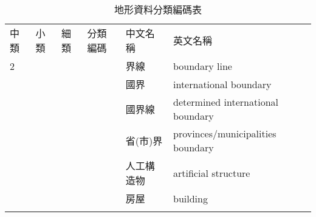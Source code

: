 \begin{table}[htbp]
\centering
\caption{地形資料分類編碼表}
\label{tab:topoItemDemo}
\begin{adjustbox}{max width=\textwidth}
\renewcommand{\arraystretch}{1.4}
\begin{tabular}{
>{\centering\arraybackslash}m{1.2cm} 
>{\centering\arraybackslash}m{1.2cm} 
>{\centering\arraybackslash}m{1.2cm} 
>{\centering\arraybackslash}m{2.5cm} 
>{\centering\arraybackslash}m{4cm} 
>{\centering\arraybackslash}m{5.5cm}
}
\Xhline{1.2pt}
中類 & 小類 & 細類 & 分類編碼 & 中文名稱 & 英文名稱 \\
\Xhline{1.2pt}
2 &  &    & 9200000 & 界線 & boundary line \\
  & 1 & 00 & 9210000 & 國界 & international boundary \\
  & 1 & 01 & 9210100 & 國界線 & determined international boundary \\
  & 2 & 00 & 9220000 & 省(市)界 & provinces/municipalities boundary \\
3 &  &    & 9300000 & 人工構造物 & artificial structure \\
  & 1 & 00 & 9310000 & 房屋 & building \\
\Xhline{1.2pt}
\end{tabular}
\end{adjustbox}
\end{table}